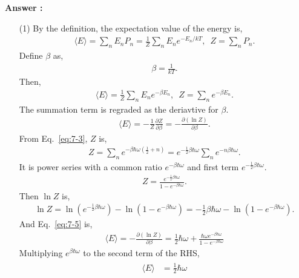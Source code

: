\documentclass[floatfix,nofootinbib,superscriptaddress,fleqn]{revtex4-2}
\begin{document}
\noindent \textbf{Answer : }
\begin{itemize}
  \item[(1)] By the definition, the expectation value of the energy is,
  \begin{align*}
    \langle E\rangle = \sum_n E_nP_n 
    = \frac{1}{Z}\sum_n E_n e^{-E_n/kT},   \,\,\,
    Z = \sum_n P_n.
  \end{align*}
  Define $\beta$ as,
  \begin{align}\label{eq:7-4}
    \beta =\frac{1}{kT}.
  \end{align}
  Then,
  \begin{align*}
    \langle E\rangle = \frac{1}{Z}\sum_n E_n e^{-\beta E_n},   \,\,\,
    Z = \sum_n e^{-\beta E_n}.
  \end{align*}
  The summation term is regraded as the deriavtive for $\beta$.
  \begin{align}\label{eq:7-5}
    \langle E\rangle = -\frac{1}{Z}\frac{\partial Z}{\partial \beta}
    = -\frac{\partial (\ln{Z})}{\partial \beta}.
  \end{align}
  From Eq.~\eqref{eq:7-3}, $Z$ is,
  \begin{align*}
    Z = \sum_n e^{-\beta\hbar\omega(\frac{1}{2}+n)} 
    = e^{-\frac{1}{2}\beta\hbar\omega}\sum_n 
    e^{-n\beta\hbar\omega}.
  \end{align*}
  It is power series with a common ratio 
  $e^{-\beta\hbar\omega}$ 
  and first term $e^{-\frac{1}{2}\beta\hbar\omega}$.
  \begin{align}
    Z = \frac{e^{-\frac{1}{2}\beta\hbar\omega}}
    {1-e^{-\beta\hbar\omega}}.
  \end{align}
  Then $\ln{Z}$ is,
  \begin{align*}
    \ln{Z} = \ln{\left(e^{-\frac{1}{2}\beta\hbar\omega}
    \right)}
    -\ln{\left(1-e^{-\beta\hbar\omega}\right)}
    =-\frac{1}{2}\beta\hbar\omega
    -\ln{\left(1-e^{-\beta\hbar\omega}\right)}.
  \end{align*}
  And Eq.~\eqref{eq:7-5} is,
  \begin{align*}
      \langle E\rangle = -\frac{\partial (\ln{Z})}
      {\partial \beta}
      = \frac{1}{2}\hbar\omega
      +\frac{\hbar\omega e^{-\beta\hbar\omega}}
      {1-e^{-\beta\hbar\omega}}  
  \end{align*}
  Multiplying $e^{\beta\hbar\omega}$ to the second term of the RHS,
  \begin{align}
    \begin{split}\label{eq:7-6}
      \langle E\rangle &=\frac{1}{2}\hbar\omega

\end{split}
\end{align}
\end{itemize}
\end{document}
